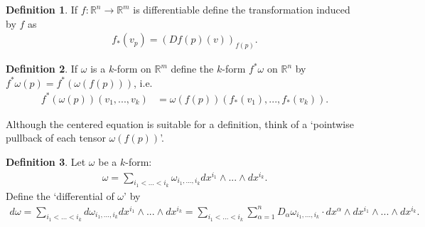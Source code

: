\documentclass[20pt]{article}
\theoremstyle{plain}
\theoremstyle{definition}
\newtheorem{definition}{Definition}
\newcommand{\reals}{\mathbb{R}}
\begin{document}
  \begin{definition}
    If $f: \reals^n \to \reals^m$ is differentiable define the transformation induced by $f$ as
    \begin{align*}
      f_*(v_p) = (Df(p)(v))_{f(p)}.
    \end{align*}
  \end{definition}

  \begin{definition}
    If $\omega$ is a $k$-form on $\reals^m$ define the $k$-form $f^*\omega$ on $\reals^n$ by
     $f^*\omega(p) = f^*(\omega(f(p)))$, i.e.
    \begin{align*}
     f^*(\omega(p))(v_1, ..., v_k) &= \omega(f(p))(f_*(v_1), ..., f_*(v_k)).
    \end{align*}
  \end{definition}
  \color{Blue}
  Although the centered equation is suitable for a definition, think of a
  `pointwise pullback of each tensor $\omega (f(p))$'.
  \color{Black}




  \begin{definition}
    Let $\omega$ be a $k$-form:
    \begin{align*}
      \omega = \sum_{i_1 < ... < i_k} \omega_{i_1,...,i_k}dx^{i_1} \wedge ... \wedge dx^{i_k}.
    \end{align*}
    Define the `differential of $\omega$' by
    \begin{align*}
      d\omega =
      \sum_{i_1 < ... < i_k} d\omega_{i_1,...,i_k}dx^{i_1} \wedge ... \wedge dx^{i_k} =
      \sum_{i_1 < ... < i_k} \sum_{\alpha = 1}^n D_\alpha \omega_{i_1,...,i_k}  \cdot dx^\alpha \wedge dx^{i_1}\wedge ... \wedge dx^{i_k}.
    \end{align*}
  \end{definition}
\end{document}
